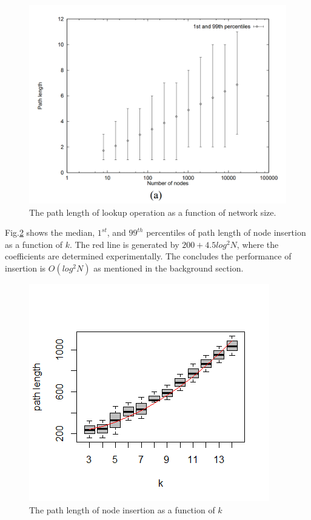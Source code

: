 \documentclass{article}
\begin{document}
\begin{figure}[H]
\centering
\includegraphics[scale=1]{oldlookup.PNG}
\caption{The path length of lookup operation as a function of network size.
\label{oldlookup}}
\end{figure}

Fig.\ref{insert} shows the median, $1^{st}$, and $99^{th}$ percentiles of path length of node insertion as a function of $k$. The red line is generated by $200+4.5log^2N$, where the coefficients are determined experimentally. The concludes the performance of insertion is $O(log^2N)$ as mentioned in the background section. 
\begin{figure}[H]
\centering
\includegraphics[scale=1]{insertion.png}
\caption{The path length of node insertion as a function of $k$
\label{insert}}
\end{figure}







\end{document}
